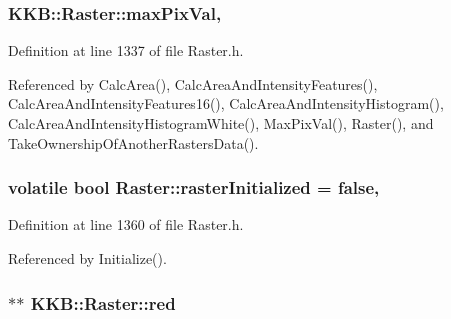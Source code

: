 \subsubsection[{\texorpdfstring{max\+Pix\+Val}{maxPixVal}}]{ K\+K\+B\+::\+Raster\+::max\+Pix\+Val\hspace{0.3cm}{\ttfamily [mutable]}, {\ttfamily [protected]}}\hypertarget{class_k_k_b_1_1_raster_a4f37d3b83826f522f61af0918a1d5546}{}\label{class_k_k_b_1_1_raster_a4f37d3b83826f522f61af0918a1d5546}


Definition at line 1337 of file Raster.\+h.



Referenced by Calc\+Area(), Calc\+Area\+And\+Intensity\+Features(), Calc\+Area\+And\+Intensity\+Features16(), Calc\+Area\+And\+Intensity\+Histogram(), Calc\+Area\+And\+Intensity\+Histogram\+White(), Max\+Pix\+Val(), Raster(), and Take\+Ownership\+Of\+Another\+Rasters\+Data().

\subsubsection[{\texorpdfstring{raster\+Initialized}{rasterInitialized}}]{\setlength{\rightskip}{0pt plus 5cm}volatile bool Raster\+::raster\+Initialized = false\hspace{0.3cm}{\ttfamily [static]}, {\ttfamily [protected]}}\hypertarget{class_k_k_b_1_1_raster_a2610974dbde577985214db37444f5560}{}\label{class_k_k_b_1_1_raster_a2610974dbde577985214db37444f5560}


Definition at line 1360 of file Raster.\+h.



Referenced by Initialize().

\subsubsection[{\texorpdfstring{red}{red}}]{$\ast$$\ast$ K\+K\+B\+::\+Raster\+::red\hspace{0.3cm}{\ttfamily [protected]}}\hypertarget{class_k_k_b_1_1_raster_a7fd39e0463c8477d0d0d26e11126d285}{}\label{class_k_k_b_1_1_raster_a7fd39e0463c8477d0d0d26e11126d285}


